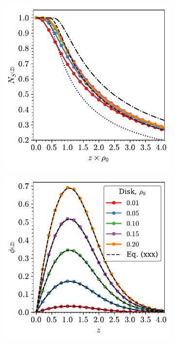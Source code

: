 \begin{figure}
     \begin{subfigure}[b]{0.48\textwidth}
         \centering
         \includegraphics[width=\textwidth]{./figures/quasi2d/n_z_3d_sphere2.pdf}
         \caption{}
         \label{fig:nphic}
     \end{subfigure}
     \hfill
      \begin{subfigure}[b]{0.48\textwidth}
         \centering
         \includegraphics[width=\textwidth]{./figures/quasi2d/phi_z_2d.pdf}
         \caption{}
         \label{fig:nphid}
     \end{subfigure}
     \hfill
     

\end{figure}
